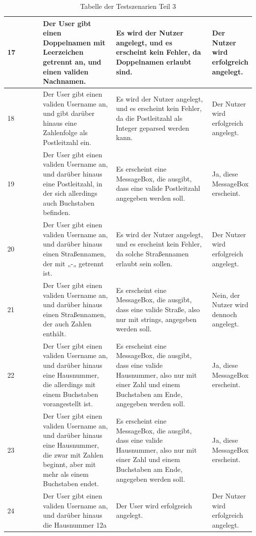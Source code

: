 \newpage
\begin{table}[h]
	\centering
	\begin{tabular}{|p{0.15\linewidth}|p{0.3\linewidth}|p{0.4\linewidth}|p{0.15\linewidth}|}
		\hline
		17 & Der User gibt einen Doppelnamen mit Leerzeichen getrennt an, und einen validen Nachnamen. & Es wird der Nutzer angelegt, und es erscheint kein Fehler, da Doppelnamen erlaubt sind. & Der Nutzer wird erfolgreich angelegt. \\ \hline
		18 & Der User gibt einen validen Username an, und gibt darüber hinaus eine Zahlenfolge als Postleitzahl ein. & Es wird der Nutzer angelegt, und es erscheint kein Fehler, da die Postleitzahl als Integer geparsed werden kann. & Der Nutzer wird erfolgreich angelegt. \\ \hline
		19 & Der User gibt einen validen Username an, und darüber hinaus eine Postleitzahl, in der sich allerdings auch Buchstaben befinden. & Es erscheint eine MessageBox, die ausgibt, dass eine valide Postleitzahl angegeben werden soll. & Ja, diese MessageBox erscheint. \\ \hline
		20 & Der User gibt einen validen Username an, und darüber hinaus einen Straßennamen, der mit „-„ getrennt ist. & Es wird der Nutzer angelegt, und es erscheint kein Fehler, da solche Straßennamen erlaubt sein sollen. & Der Nutzer wird erfolgreich angelegt. \\ \hline
		21 & Der User gibt einen validen Username an, und darüber hinaus einen Straßennamen, der auch Zahlen enthält. & Es erscheint eine MessageBox, die ausgibt, dass eine valide Straße, also nur mit strings, angegeben werden soll. & Nein, der Nutzer wird dennoch angelegt. \\ \hline
		22 & Der User gibt einen validen Username an, und darüber hinaus eine Hausnummer, die allerdings mit einem Buchstaben vorangestellt ist. & Es erscheint eine MessageBox, die ausgibt, dass eine valide Hausnummer, also nur mit einer Zahl und einem Buchstaben am Ende, angegeben werden soll. & Ja, diese MessageBox erscheint. \\ \hline
		23 & Der User gibt einen validen Username an, und darüber hinaus eine Hausnummer, die zwar mit Zahlen beginnt, aber mit mehr als einem Buchstaben endet. & Es erscheint eine MessageBox, die ausgibt, dass eine valide Hausnummer, also nur mit einer Zahl und einem Buchstaben am Ende, angegeben werden soll. & Ja, diese MessageBox erscheint. \\ \hline
		24 & Der User gibt einen validen Username an, und darüber hinaus die Hausnummer 12a & Der User wird erfolgreich angelegt. & Der Nutzer wird erfolgreich angelegt. \\ \hline
		
	\end{tabular}
	\caption{Tabelle der Testszenarien Teil 3}
\end{table}

